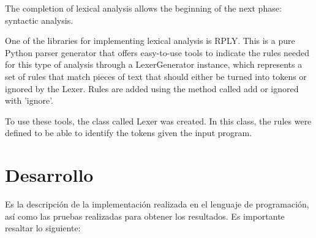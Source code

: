 \documentclass[letterpaper,12pt,oneside]{article}
\begin{document}
The completion of lexical analysis allows the beginning of the next phase: syntactic analysis.  \cite{ramirez_analizadores}


\bigskip
One of the libraries for implementing lexical analysis is RPLY. This is a pure Python parser generator that offers easy-to-use tools to indicate the rules needed for this type of analysis through a LexerGenerator instance, which represents a set of rules that match pieces of text that should either be turned into tokens or ignored by the Lexer. Rules are added using the method called add or ignored with 'ignore'.

\bigskip

To use these tools, the class called Lexer was created. In this class, the rules were defined to be able to identify the tokens given the input program.

\section{Desarrollo}

Es la descripción de la implementación realizada en el lenguaje de programación, así como las pruebas realizadas para obtener los resultados. Es importante resaltar lo siguiente:
\end{document}

